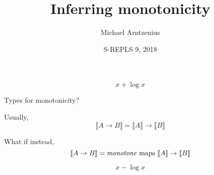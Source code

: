 \documentclass{beamer}
\title{Inferring monotonicity}
\author{Michael Arntzenius}
\institute{University of Birmingham}
\date{S-REPLS 9, 2018}
\newcommand{\den}[1]{\llbracket{#1}\rrbracket}
\begin{document}
\maketitle

\begin{frame}
  \Huge \[ x + \log x \]
\end{frame}

\begin{frame}{Types for monotonicity?}
  \Large

  Usually, \[\den{A \to B} = \den{A} \to \den{B}\]\vspace{0pt}

  What if instead,
  \[
  \den{A \to B} = \text{\emph{monotone} maps }\den{A} \to \den{B}
  \]
\end{frame}

\begin{frame}
  \Huge
\[ x - \log x \]
\end{frame}
\end{document}

